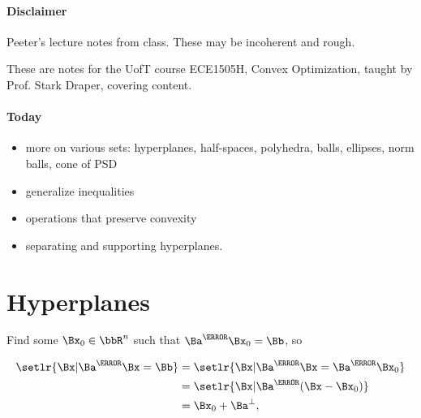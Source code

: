 
\renewcommand{\basename}{convexOptimization4}
\renewcommand{\dirname}{notes/ece1505/}
\newcommand{\keywords}{ECE1505H}


\usepackage{ece1505}
\usepackage{peeters_braket}
\usepackage{peeters_layout_exercise}
\usepackage{peeters_figures}
\usepackage{mathtools}
\usepackage{siunitx}
\usepackage{macros_cal}

\beginArtNoToc
{}
\label{chap:convexOptimization4}

\paragraph{Disclaimer}

Peeter's lecture notes from class.  These may be incoherent and rough.

These are notes for the UofT course ECE1505H, Convex Optimization, taught by Prof. Stark Draper, covering \citep{boyd2004convex} content.

\paragraph{Today}

\begin{itemize}
\item more on various sets: hyperplanes, half-spaces, polyhedra, balls, ellipses, norm balls, cone of PSD
\item generalize inequalities
\item operations that preserve convexity
\item separating and supporting hyperplanes.
\end{itemize}

\section{Hyperplanes}

Find some \( \Bx_0 \in \bbR^n \) such that \( \Ba^\T \Bx_0 = \Bb \), so

\begin{dmath}\label{eqn:convexOptimizationLecture4:20}
\begin{aligned}
\setlr{ \Bx | \Ba^\T \Bx = \Bb }
&=
\setlr{ \Bx | \Ba^\T \Bx = \Ba^\T \Bx_0 } \\
&=
\setlr{ \Bx | \Ba^\T (\Bx - \Bx_0) } \\
&=
\Bx_0 + \Ba^\perp,
\end{aligned}
\end{dmath}


